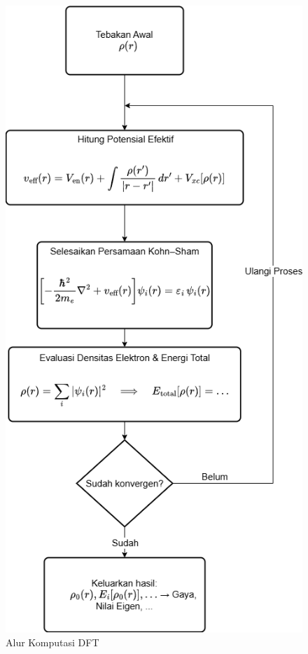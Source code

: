 \begin{figure}
    \centering
    \includegraphics[width=0.6\linewidth]{gambar/DFT.drawio.png}
    \caption{Alur Komputasi DFT }
    \label{Diagram Alir DFT}
\end{figure}



